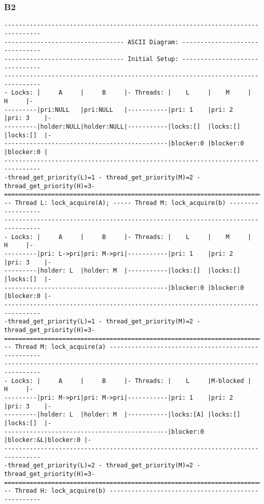 \documentclass[a4wide, 11pt]{article}
\begin{document}
\subsubsection{B2}
\begin{verbatim}
--------------------------------------------------------------------------------
--------------------------------- ASCII Diagram: -------------------------------
--------------------------------- Initial Setup: -------------------------------
--------------------------------------------------------------------------------
- Locks: |     A     |     B     |- Threads: |    L     |    M     |    H     |-
---------|pri:NULL   |pri:NULL   |-----------|pri: 1    |pri: 2    |pri: 3    |-
---------|holder:NULL|holder:NULL|-----------|locks:[]  |locks:[]  |locks:[]  |-
---------------------------------------------|blocker:0 |blocker:0 |blocker:0 |
--------------------------------------------------------------------------------
-thread_get_priority(L)=1 - thread_get_priority(M)=2 - thread_get_priority(H)=3-
================================================================================
-- Thread L: lock_acquire(A); ----- Thread M: lock_acquire(b) ------------------
--------------------------------------------------------------------------------
- Locks: |     A     |     B     |- Threads: |    L     |    M     |    H     |-
---------|pri: L->pri|pri: M->pri|-----------|pri: 1    |pri: 2    |pri: 3    |-
---------|holder: L  |holder: M  |-----------|locks:[]  |locks:[]  |locks:[]  |-
---------------------------------------------|blocker:0 |blocker:0 |blocker:0 |-
--------------------------------------------------------------------------------
-thread_get_priority(L)=1 - thread_get_priority(M)=2 - thread_get_priority(H)=3-
================================================================================
-- Thread M: lock_acquire(a) ---------------------------------------------------
--------------------------------------------------------------------------------
- Locks: |     A     |     B     |- Threads: |    L     |M-blocked |    H     |-
---------|pri: M->pri|pri: M->pri|-----------|pri: 1    |pri: 2    |pri: 3    |-
---------|holder: L  |holder: M  |-----------|locks:[A] |locks:[]  |locks:[]  |-
---------------------------------------------|blocker:0 |blocker:&L|blocker:0 |-
--------------------------------------------------------------------------------
-thread_get_priority(L)=2 - thread_get_priority(M)=2 - thread_get_priority(H)=3-
================================================================================
-- Thread H: lock_acquire(b) ---------------------------------------------------

\end{verbatim}
\end{document}
